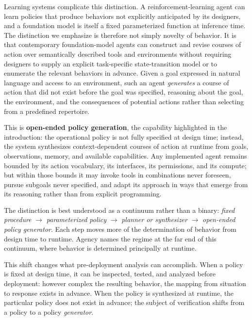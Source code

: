 \documentclass[11pt]{article}
\begin{document}
Learning systems complicate this distinction. A reinforcement-learning agent can learn policies that produce behaviors not explicitly anticipated by its designers, and a foundation model is itself a fixed parameterized function at inference time. The distinction we emphasize is therefore not simply novelty of behavior. It is that contemporary foundation-model agents can construct and revise courses of action over semantically described tools and environments without requiring designers to supply an explicit task-specific state-transition model or to enumerate the relevant behaviors in advance. Given a goal expressed in natural language and access to an environment, such an agent \textit{generates} a course of action that did not exist before the goal was specified, reasoning about the goal, the environment, and the consequences of potential actions rather than selecting from a predefined repertoire.

This is \textbf{open-ended policy generation}, the capability highlighted in the introduction: the operational policy is not fully specified at design time; instead, the system synthesizes context-dependent courses of action at runtime from goals, observations, memory, and available capabilities. Any implemented agent remains bounded by its action vocabulary, its interfaces, its permissions, and its compute; but within those bounds it may invoke tools in combinations never foreseen, pursue subgoals never specified, and adapt its approach in ways that emerge from its reasoning rather than from explicit programming.

The distinction is best understood as a continuum rather than a binary: \textit{fixed procedure} $\rightarrow$ \textit{parameterized policy} $\rightarrow$ \textit{planner or synthesizer} $\rightarrow$ \textit{open-ended policy generator}. Each step moves more of the determination of behavior from design time to runtime. Agency names the regime at the far end of this continuum, where behavior is determined principally at runtime.

This shift changes what pre-deployment analysis can accomplish. When a policy is fixed at design time, it can be inspected, tested, and analyzed before deployment: however complex the resulting behavior, the mapping from situation to response exists in advance. When the policy is synthesized at runtime,     the particular policy does not exist in advance; the subject of verification shifts from a policy to a policy \textit{generator}.
\end{document}
